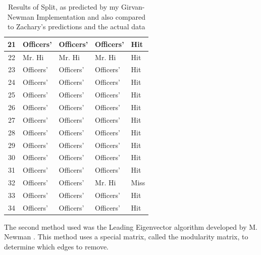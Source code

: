 \begin{table}
\begin{tabular}{ | c | p{2cm} | p{2cm} | p{2cm} | p{2cm} | }
\hline
21 & Officers' & Officers' & Officers' & Hit \\
\hline
22 & Mr. Hi & Mr. Hi & Mr. Hi & Hit \\
\hline
23 & Officers' & Officers' & Officers' & Hit \\
\hline
24 & Officers' & Officers' & Officers' & Hit \\
\hline
25 & Officers' & Officers' & Officers' & Hit \\
\hline
26 & Officers' & Officers' & Officers' & Hit \\
\hline
27 & Officers' & Officers' & Officers' & Hit \\
\hline
28 & Officers' & Officers' & Officers' & Hit \\
\hline
29 & Officers' & Officers' & Officers' & Hit \\
\hline
30 & Officers' & Officers' & Officers' & Hit \\
\hline
31 & Officers' & Officers' & Officers' & Hit \\
\hline
32 & Officers' & Officers' & Mr. Hi & Miss \\
\hline
33 & Officers' & Officers' & Officers' & Hit \\
\hline
34 & Officers' & Officers' & Officers' & Hit \\
\hline
\end{tabular}

\caption{Results of Split, as predicted by my Girvan-Newman Implementation and also compared to Zachary's predictions and the actual data}
\label{tab:results}
\end{table}


\clearpage

The second method used was the Leading Eigenvector algorithm developed by M. Newman \cite{new06}. This method uses a special matrix, called the modularity matrix, to determine which edges to remove.

